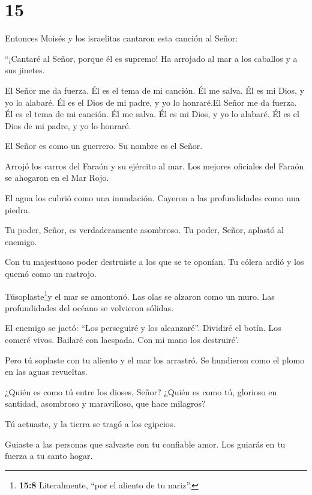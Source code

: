 \hypertarget{section-14}{%
\section{15}\label{section-14}}

 Entonces Moisés y los israelitas cantaron esta canción al
Señor:

``¡Cantaré al Señor, porque él es supremo! Ha arrojado al mar a los
caballos y a sus jinetes.

 El Señor me da fuerza. Él es el tema de mi canción. Él me
salva. Él es mi Dios, y yo lo alabaré. Él es el Dios de mi padre, y yo
lo honraré.El Señor me da fuerza. Él es el tema de mi canción. Él me
salva. Él es mi Dios, y yo lo alabaré. Él es el Dios de mi padre, y yo
lo honraré.

 El Señor es como un guerrero. Su nombre es el Señor.

 Arrojó los carros del Faraón y su ejército al mar. Los
mejores oficiales del Faraón se ahogaron en el Mar Rojo.

 El agua los cubrió como una inundación. Cayeron a las
profundidades como una piedra.

 Tu poder, Señor, es verdaderamente asombroso. Tu poder,
Señor, aplastó al enemigo.

 Con tu majestuoso poder destruiste a los que se te oponían.
Tu cólera ardió y los quemó como un rastrojo.

 Túsoplaste\footnote{\textbf{15:8} Literalmente, ``por el
  aliento de tu nariz''.}y el mar se amontonó. Las olas se alzaron como
un muro. Las profundidades del océano se volvieron sólidas.

 El enemigo se jactó: ``Los perseguiré y los alcanzaré''.
Dividiré el botín. Los comeré vivos. Bailaré con laespada. Con mi mano
los destruiré'.

 Pero tú soplaste con tu aliento y el mar los arrastró. Se
hundieron como el plomo en las aguas revueltas.

 ¿Quién es como tú entre los dioses, Señor? ¿Quién es como
tú, glorioso en santidad, asombroso y maravilloso, que hace milagros?

 Tú actuaste, y la tierra se tragó a los egipcios.

 Guiaste a las personas que salvaste con tu confiable amor.
Los guiarás en tu fuerza a tu santo hogar.

